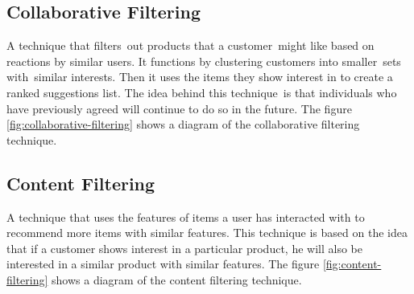 \subsection{Collaborative Filtering}
A technique that filters out products that a customer might like based on reactions by similar users. It functions by clustering customers into smaller sets with similar interests. Then it uses the items they show interest in to create a ranked suggestions list. The idea behind this technique is that individuals who have previously agreed will continue to do so in the future. The figure \ref{fig:collaborative-filtering} shows a diagram of the collaborative filtering technique.

\subsection{Content Filtering}
A technique that uses the features of items a user has interacted with to recommend more items with similar features. This technique is based on the idea that if a customer shows interest in a particular product, he will also be interested in a similar product with similar features. The figure \ref{fig:content-filtering} shows a diagram of the content filtering technique. \\



